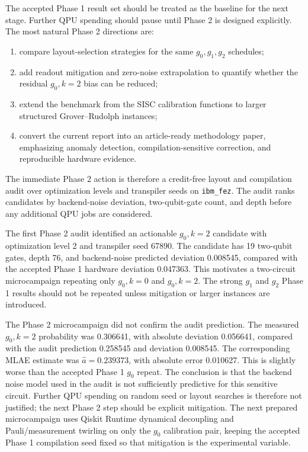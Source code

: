 The accepted Phase 1 result set should be treated as the baseline for the next
stage. Further QPU spending should pause until Phase 2 is designed explicitly.
The most natural Phase 2 directions are:
\begin{enumerate}[leftmargin=*]
  \item compare layout-selection strategies for the same \(g_0,g_1,g_2\)
        schedules;
  \item add readout mitigation and zero-noise extrapolation to quantify whether
        the residual \(g_0,k=2\) bias can be reduced;
  \item extend the benchmark from the SISC calibration functions to larger
        structured Grover--Rudolph instances;
  \item convert the current report into an article-ready methodology paper,
        emphasizing anomaly detection, compilation-sensitive correction, and
        reproducible hardware evidence.
\end{enumerate}

The immediate Phase 2 action is therefore a credit-free layout and compilation
audit over optimization levels and transpiler seeds on \texttt{ibm\_fez}. The
audit ranks candidates by backend-noise deviation, two-qubit-gate count, and
depth before any additional QPU jobs are considered.

The first Phase 2 audit identified an actionable \(g_0,k=2\) candidate with
optimization level 2 and transpiler seed 67890. The candidate has 19 two-qubit
gates, depth 76, and backend-noise predicted deviation 0.008545, compared with
the accepted Phase 1 hardware deviation 0.047363. This motivates a two-circuit
microcampaign repeating only \(g_0,k=0\) and \(g_0,k=2\). The strong \(g_1\) and
\(g_2\) Phase 1 results should not be repeated unless mitigation or larger
instances are introduced.

The Phase 2 microcampaign did not confirm the audit prediction. The measured
\(g_0,k=2\) probability was 0.306641, with absolute deviation 0.056641, compared
with the audit prediction 0.258545 and deviation 0.008545. The corresponding
MLAE estimate was \(\hat{a}=0.239373\), with absolute error 0.010627. This is
slightly worse than the accepted Phase 1 \(g_0\) repeat. The conclusion is that
the backend noise model used in the audit is not sufficiently predictive for
this sensitive circuit. Further QPU spending on random seed or layout searches
is therefore not justified; the next Phase 2 step should be explicit mitigation.
The next prepared microcampaign uses Qiskit Runtime dynamical decoupling and
Pauli/measurement twirling on only the \(g_0\) calibration pair, keeping the
accepted Phase 1 compilation seed fixed so that mitigation is the experimental
variable.

